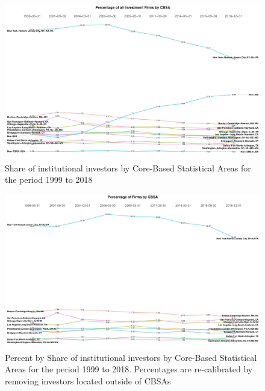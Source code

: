 \begin{figure}[h]
	\centering
	\includegraphics[width=1\linewidth]{Figures/ChapterIII/Percentage_of_Investment_Firms_by_CBSA}
	\caption[Share of Institutional Investors by CBSA]{Share of institutional investors by Core-Based Statistical Areas for the period 1999 to 2018}
	\label{fig:percentageofinvestmentfirmsbycbsa}
\end{figure}



\begin{figure}
	\centering
	\includegraphics[width=1\linewidth]{Figures/ChapterIII/Percentage_of_Firms_by_CBSA}
	\caption[Percent by Share of Institutional Investors CBSA]{Percent by Share of institutional investors by Core-Based Statistical Areas for the period 1999 to 2018. Percentages are re-calibrated by removing investors located outside of CBSAs}
	\label{fig:percentageoffirmsbycbsa}
\end{figure}



